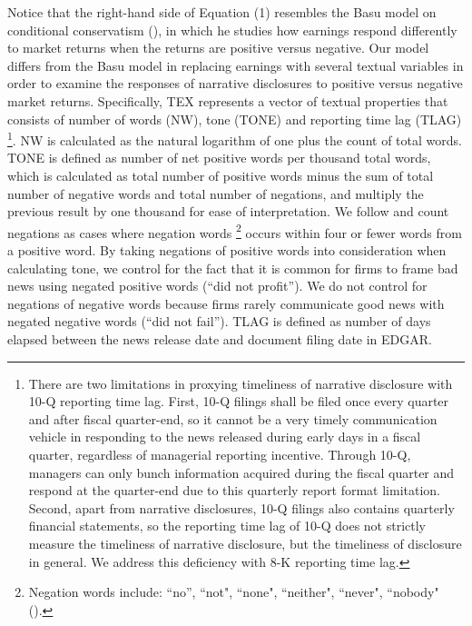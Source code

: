 \documentclass[a4paper]{article}
\begin{document}
\begin{spacing}{2}
Notice that the right-hand side of Equation (1) resembles the Basu model on conditional conservatism (\cite{basuConservatismPrincipleAsymmetric1997}), in which he studies how earnings respond differently to market returns when the returns are positive versus negative. Our model differs from the Basu model in replacing earnings with several textual variables in order to examine the responses of narrative disclosures to positive versus negative market returns. Specifically, TEX represents a vector of textual properties that consists of number of words (NW), tone (TONE) and reporting time lag (TLAG) \footnote{There are two limitations in proxying timeliness of narrative disclosure with 10-Q reporting time lag. First, 10-Q filings shall be filed once every quarter and after fiscal quarter-end, so it cannot be a very timely communication vehicle in responding to the news released during early days in a fiscal quarter, regardless of managerial reporting incentive. Through 10-Q, managers can only bunch information acquired during the fiscal quarter and respond at the quarter-end due to this quarterly report format limitation. Second, apart from narrative disclosures, 10-Q filings also contains quarterly financial statements, so the reporting time lag of 10-Q does not strictly measure the timeliness of narrative disclosure, but the timeliness of disclosure in general. We address this deficiency with 8-K reporting time lag.}. NW is calculated as the natural logarithm of one plus the count of total words. TONE is defined as number of net positive words per thousand total words, which is calculated as total number of positive words minus the sum of total number of negative words and total number of negations, and multiply the previous result by one thousand for ease of interpretation. We follow \cite{loughranWhenLiabilityNot2011} and count negations as cases where negation words \footnote{Negation words include: “no”, “not", “none", “neither", “never", “nobody" (\cite{tottieNegationEnglishSpeech1991}).} occurs within four or fewer words from a positive word. By taking negations of positive words into consideration when calculating tone, we control for the fact that it is common for firms to frame bad news using negated positive words (“did not profit”). We do not control for negations of negative words because firms rarely communicate good news with negated negative words (“did not fail”). TLAG is defined as number of days elapsed between the news release date and document filing date in EDGAR.


\end{spacing}
\end{document}
